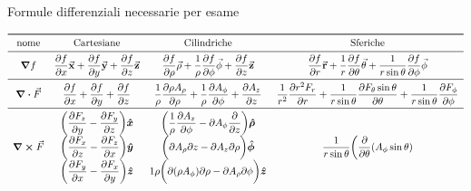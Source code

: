 \documentclass[a4paper]{scrarticle}
\begin{document}
\pagebreak

\begin{sidewaystable}
\caption{Formule differenziali necessarie per esame}
    \[
\begin{array}{cccc}
    \toprule
    \text{nome} & \text{Cartesiane} & \text{Cilindriche} & \text{Sferiche}\\
\midrule
\displaystyle \grad{f} & 
    \displaystyle \pdv{f}{x} \va x + \pdv{f}{y} \va y + \pdv{f}{z} \va z &
    \displaystyle \pdv{f}{\rho}\va \rho + \frac{1}{\rho}\pdv{f}{\phi}\va \phi + \pdv{f}{z} \va z &
    \displaystyle \pdv{f}{r} \va r + \frac{1}{r} \pdv{f}{\theta} \va \theta + \frac{1}{r\sin{\theta}} \pdv{f}{\phi} \va \phi\\ 
\midrule
\displaystyle \div{\vec{F}} &
    \displaystyle \pdv{f}{x} + \pdv{f}{y} + \pdv{f}{z} &
    \displaystyle \frac{1}{\rho} \pdv{ \rho A_\rho } { \rho}
    + \frac{1} {\rho}\pdv {A_\phi} {\phi}
    + \pdv{ A_z} {z}&
    \displaystyle \frac{1}{r^2} \pdv{r^2 F_r}{r} + \frac{1}{r \sin \theta} \pdv{F_{\theta} \sin \theta}{\theta} + \frac{1}{ r \sin \theta}\pdv{F_{\phi}}{\phi}\\ 
\midrule
\displaystyle \curl{\vec{F}} & 
\begin{matrix}
    \displaystyle \bigg(\pdv{F_z}{y} - \pdv{F_y}{z} \bigg) \boldsymbol{\hat x}\\
    \displaystyle \bigg(\pdv{F_x}{z} - \pdv{F_z}{x}\bigg) \boldsymbol{\hat y}\\
    \displaystyle \bigg(\pdv{F_y}{x} - \pdv{F_x}{y}\bigg) \boldsymbol{\hat z}
\end{matrix} & 
\begin{matrix}
    \displaystyle \bigg (\frac{1 }{ \rho}\pdv{ A_z }{ \phi}
    - {\partial A_\phi } \pdv{  z} \bigg ) \boldsymbol{\hat \rho}  \\
    \displaystyle \bigg ({\partial A_\rho }{ \partial z} - {\partial A_z }{ \partial \rho} \bigg) \boldsymbol{\hat \phi} \\
    \displaystyle{1 }{ \rho}\bigg ({\partial ( \rho A_\phi ) }{ \partial \rho}
    - {\partial A_\rho }{ \partial \phi} \bigg ) \boldsymbol{\hat z}
\end{matrix} &
\begin{matrix}
    \displaystyle \frac{1 }{ r\sin\theta} \bigg (\frac{\partial }{ \partial \theta} ( A_\phi\sin\theta )

\end{matrix}
\end{array}\]
\end{sidewaystable}
\end{document}
